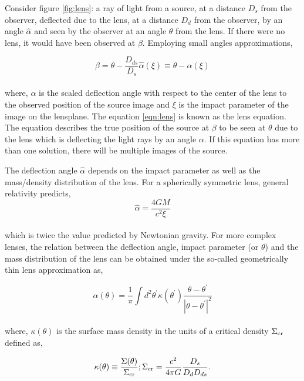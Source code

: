 Consider figure \ref{fig:lens}: a ray of light from a source, at a distance $D_s$ from
the observer, deflected due to the lens, at a distance $D_d$ from the observer,  by an 
angle $\hat{\alpha}$ and seen
by the observer at an angle $\theta$ from the lens. If there were no lens, it would have
been observed at $\beta$. Employing small angles approximations, 

\begin{equation}
	\beta  = \theta  - \dfrac{D_{ds}}{D_s} \hat{\alpha}(\xi) \equiv \theta - \alpha(\xi)
	\label{eqn:lens}
\end{equation}
\\
where, $\alpha$ is the scaled deflection angle with respect to the center of the 
lens to the observed position of the source image and $\xi$ is the impact parameter
of the image on the lensplane. The equation \ref{eqn:lens} is known
as the lens equation. The equation describes the true position of the source at $\beta$ to
be seen at $\theta$ due to the lens which is deflecting the light rays by an angle $\alpha$.
If this equation has more than one solution, there will be multiple images of the source. 

The deflection angle $\hat{\alpha}$ depends on the impact parameter as well as the 
mass/density distribution of the lens. For a spherically symmetric lens, general relativity
predicts,
\begin{equation}
	\hat{\alpha} = \dfrac{4GM}{c^2 \xi}
\end{equation}
\\
which is twice the value predicted by Newtonian gravity. For more complex lenses, the 
relation between the deflection angle, impact parameter (or $\theta$) and the mass
distribution of the lens can be obtained under the so-called geometrically thin lens
approximation as,

\begin{equation}
	\alpha(\theta) = \dfrac{1}{\pi} \int d^2\theta^{\prime}
						\kappa(\theta^{\prime})
						\dfrac{\theta-\theta^{\prime}}{|\theta-\theta^{\prime}|^2}
\end{equation}
\\
where, $\kappa(\theta)$ is the surface mass density in the units of a critical 
density $\Sigma_{\rm cr}$ defined as,

\begin{equation}
	\kappa(\theta) \equiv \dfrac{\Sigma(\theta)}{\Sigma_{\rm cr}}; 
	\Sigma_{\rm cr} = \dfrac{c^2}{4\pi G} \dfrac{D_s}{D_d D_{ds}}.
\end{equation}

